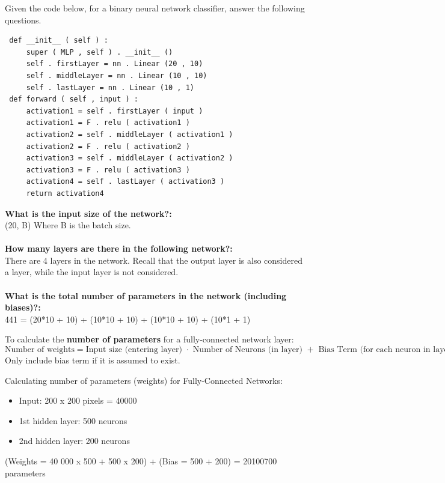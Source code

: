\begin{example}
    Given the code below, for a binary neural network classifier, answer the following questions.
    \begin{verbatim}
 def __init__ ( self ) :
     super ( MLP , self ) . __init__ ()
     self . firstLayer = nn . Linear (20 , 10)
     self . middleLayer = nn . Linear (10 , 10)
     self . lastLayer = nn . Linear (10 , 1)
 def forward ( self , input ) :
     activation1 = self . firstLayer ( input )
     activation1 = F . relu ( activation1 )
     activation2 = self . middleLayer ( activation1 )
     activation2 = F . relu ( activation2 )
     activation3 = self . middleLayer ( activation2 )
     activation3 = F . relu ( activation3 )
     activation4 = self . lastLayer ( activation3 )
     return activation4
    \end{verbatim}
\textbf{What is the input size of the network?:}
\\(20, B) Where B is the batch size.\\
\\\textbf{How many layers are there in the following network?:}
\\There are 4 layers in the network. Recall that the output layer is also considered a layer, while the input layer is not considered.\\
\textbf{\\What is the total number of parameters in the network (including biases)?:}
\\441 = (20*10 + 10) + (10*10 + 10) + (10*10 + 10) + (10*1 + 1)
\end{example}

\begin{idea}
    To calculate the \textbf{number of parameters} for a fully-connected network layer:
\[\text{Number of weights} = \text{Input size (entering layer) } \cdot \text{ Number of Neurons (in layer) } + \text{ Bias Term (for each neuron in layer)}\]
Only include bias term if it is assumed to exist.

\end{idea}

\begin{example}
    Calculating number of parameters (weights) for Fully-Connected Networks:
    \begin{itemize}
        \item Input: 200 x 200 pixels = 40000
        \item 1st hidden layer: 500 neurons
        \item 2nd hidden layer: 200 neurons
    \end{itemize}
(Weights = 40 000 x 500 + 500 x 200) + (Bias = 500 + 200) = 20100700 parameters
\end{example}

